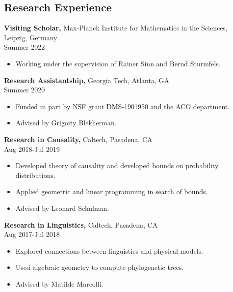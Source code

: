 \documentclass[margin]{res}
\begin{document}
\begin{resume}
\section{Research Experience}
{\bf Visiting Scholar,} Max-Planck Institute for Mathematics in the Sciences, Leipzig, Germany \\ Summer 2022
\begin{itemize} \itemsep -2pt %
\item Working under the supervision of Rainer Sinn and Bernd Sturmfels.
\end{itemize}
{\bf Research Assistantship,} Georgia Tech, Atlanta, GA \\ Summer 2020
\begin{itemize} \itemsep -2pt %
\item Funded in part by NSF grant DMS-1901950 and the ACO department.
\item Advised by Grigoriy Blekherman.
\end{itemize}
 
{\bf Research in Causality,} Caltech, Pasadena, CA \\ Aug 2018-Jul 2019
\begin{itemize} \itemsep -2pt %
\item Developed theory of causality and developed bounds on probability distributions.
\item Applied geometric and linear programming in search of bounds.
\item Advised by Leonard Schulman.
\end{itemize}
 
{\bf Research in Linguistics,} Caltech, Pasadena, CA \\ Aug 2017-Jul 2018
\begin{itemize} \itemsep -2pt %
\item Explored connections between linguistics and physical models.
\item Used algebraic geometry to compute phylogenetic trees.
\item Advised by Matilde Marcolli.
\end{itemize}


\end{resume}
\end{document}
